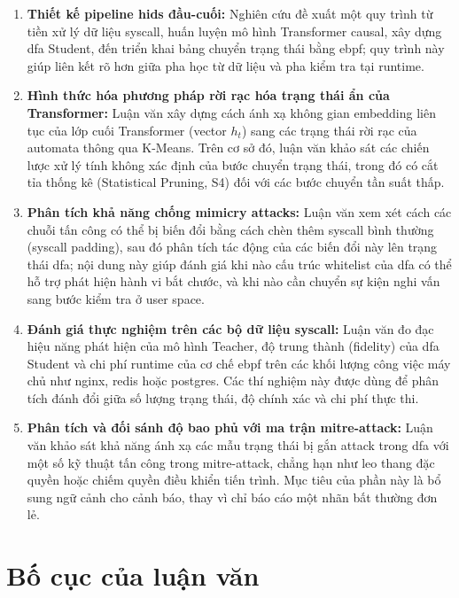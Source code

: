 \documentclass[../main.tex]{subfiles}
\begin{document}
\begin{enumerate}
  \item \textbf{Thiết kế pipeline \gls{hids} đầu-cuối:} Nghiên cứu đề xuất
    một quy trình từ tiền xử lý dữ liệu \gls{syscall}, huấn luyện mô hình
    Transformer causal, xây dựng \gls{dfa} Student, đến triển khai bảng
    chuyển trạng thái bằng \gls{ebpf}; quy trình này giúp liên kết rõ hơn
    giữa pha học từ dữ liệu và pha kiểm tra tại runtime.
  \item \textbf{Hình thức hóa phương pháp rời rạc hóa trạng thái ẩn của
    Transformer:} Luận văn xây dựng cách ánh xạ không gian embedding
    liên tục của lớp cuối Transformer (vector $h_t$) sang các trạng
    thái rời rạc của automata thông qua K-Means. Trên cơ sở đó, luận
    văn khảo sát các chiến lược xử lý tính không xác định của bước
    chuyển trạng thái, trong đó có cắt tỉa thống kê (Statistical
    Pruning, S4) đối với các bước chuyển tần suất thấp.
  \item \textbf{Phân tích khả năng chống mimicry attacks:} Luận văn
    xem xét cách các chuỗi tấn công có thể bị biến đổi bằng cách chèn
    thêm \gls{syscall} bình thường (\gls{syscall} padding), sau đó phân tích tác
    động của các biến đổi này lên trạng thái \gls{dfa}; nội dung này giúp
    đánh giá khi nào cấu trúc whitelist của \gls{dfa} có thể hỗ trợ phát
    hiện hành vi bắt chước, và khi nào cần chuyển sự kiện nghi vấn
    sang bước kiểm tra ở user space.
  \item \textbf{Đánh giá thực nghiệm trên các bộ dữ liệu \gls{syscall}:}
    Luận văn đo đạc hiệu năng phát hiện của mô hình Teacher, độ trung
    thành (fidelity) của \gls{dfa} Student và chi phí runtime của cơ chế
    \gls{ebpf} trên các khối lượng công việc máy chủ như nginx, redis hoặc
    postgres. Các thí nghiệm này được dùng để phân tích đánh đổi giữa
    số lượng trạng thái, độ chính xác và chi phí thực thi.
  \item \textbf{Phân tích và đối sánh độ bao phủ với ma trận \gls{mitre-attack}:}
    Luận văn khảo sát khả năng ánh xạ các mẫu trạng thái bị gắn attack
    trong \gls{dfa} với một số kỹ thuật tấn công trong \gls{mitre-attack}, chẳng
    hạn như leo thang đặc quyền hoặc chiếm quyền điều khiển tiến
    trình. Mục tiêu của phần này là bổ sung ngữ cảnh cho cảnh báo,
    thay vì chỉ báo cáo một nhãn bất thường đơn lẻ.
\end{enumerate}

\section{Bố cục của luận văn}
\label{sec:bocuc}
\end{document}
